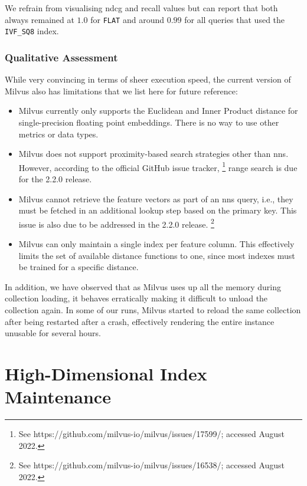 We refrain from visualising \acrshort{ndcg} and recall values but can report that both always remained at $1.0$ for \texttt{FLAT} and around $0.99$ for all queries that used the \texttt{IVF\_SQ8} index.

\subsubsection{Qualitative Assessment}
While very convincing in terms of sheer execution speed, the current version of Milvus also has limitations that we list here for future reference:

\begin{itemize}
    \item Milvus currently only supports the Euclidean and Inner Product distance for single-precision floating point embeddings. There is no way to use other metrics or data types.
    \item Milvus does not support proximity-based search strategies other than \acrshort{nns}. However, according to the official GitHub issue tracker, \footnote{See https://github.com/milvus-io/milvus/issues/17599/; accessed August 2022.} range search is due for the 2.2.0 release. 
    \item Milvus cannot retrieve the feature vectors as part of an \acrshort{nns} query, i.e., they must be fetched in an additional lookup step based on the primary key. This issue is also due to be addressed in the 2.2.0 release. \footnote{See https://github.com/milvus-io/milvus/issues/16538/; accessed August 2022.}
    \item Milvus can only maintain a single index per feature column. This effectively limits the set of available distance functions to one, since most indexes must be trained for a specific distance.
\end{itemize}

In addition, we have observed that as Milvus uses up all the memory during collection loading, it behaves erratically making it difficult to unload the collection again. In some of our runs, Milvus started to reload the same collection after being restarted after a crash, effectively rendering the entire instance unusable for several hours.

\section{High-Dimensional Index Maintenance}
\label{section:hd_index_maintenance_evaluation}

